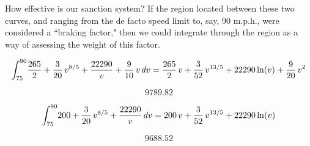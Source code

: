 \documentclass{article}
\begin{document}
\begin{maplegroup}
\begin{mapleinput}
\end{mapleinput}

\end{maplegroup}
\begin{maplegroup}
How effective is our sanction system? If the region located between
these two curves, and ranging from the de facto speed limit to, say,
90 m.p.h., were considered a ``braking factor," then we could
integrate through the region as a way of assessing the weight of this
factor.

\begin{mapleinput}
\end{mapleinput}

\mapleresult
\begin{maplelatex}
\[
{\displaystyle \int _{75}^{90}} {\displaystyle \frac {265}{2}}
 + {\displaystyle \frac {3}{20}} \,v^{8/5} + {\displaystyle
\frac {22290}{v}}  + {\displaystyle \frac {9}{10}} \,v\,dv=
{\displaystyle \frac {265}{2}} \,v + {\displaystyle \frac {3}{52}
} \,v^{13/5} + 22290\,{\rm ln}(v) + {\displaystyle \frac {9}{20}
} \,v^{2}
\]
\end{maplelatex}

\end{maplegroup}
\begin{maplegroup}
\begin{mapleinput}
\end{mapleinput}

\mapleresult
\begin{maplelatex}
\[
9789.82
\]
\end{maplelatex}

\end{maplegroup}
\begin{maplegroup}
\begin{mapleinput}
\end{mapleinput}

\mapleresult
\begin{maplelatex}
\[
{\displaystyle \int _{75}^{90}} 200 + {\displaystyle \frac {3}{20
}} \,v^{8/5} + {\displaystyle \frac {22290}{v}} \,dv=200\,v +
{\displaystyle \frac {3}{52}} \,v^{13/5} + 22290\,{\rm ln}(v)
\]
\end{maplelatex}

\begin{maplelatex}
\[
9688.52
\]
\end{maplelatex}

\end{maplegroup}
\end{document}
